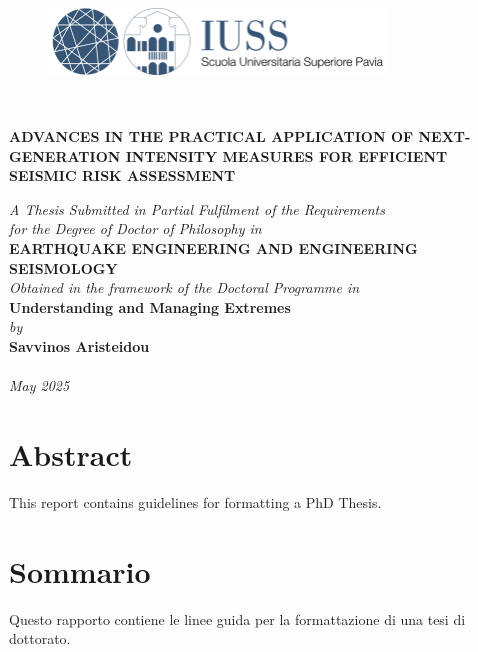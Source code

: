\documentclass[12pt,a4paper,twoside, openright]{report}
\let\oldchapter\chapter
\renewcommand{\chapter}[1]{
	\oldchapter{#1}
	\thispagestyle{empty}
}
\begin{document}
	
	\begin{titlepage}
		\centering
		\begin{figure}[h!]
			\centering
			\includegraphics[width=0.8\textwidth]{figures/IUSS_logo.png}
		\end{figure}
		\\
		\vspace*{2cm}
		{\Large\bfseries ADVANCES IN THE PRACTICAL APPLICATION OF NEXT-GENERATION INTENSITY MEASURES FOR EFFICIENT SEISMIC RISK ASSESSMENT\par}
		\vspace{1cm}
		\textit{A Thesis Submitted in Partial Fulfilment of the Requirements\\
			for the Degree of Doctor of Philosophy in}\\[1cm]
		\textbf{EARTHQUAKE ENGINEERING AND ENGINEERING SEISMOLOGY}\\
		\vspace{1cm}
		\textit{Obtained in the framework of the Doctoral Programme in}\\[0.8cm]
		\textbf{Understanding and Managing Extremes}\\[1cm]
		\textit{by}\\[0.3cm]
		\textbf{Savvinos Aristeidou}\\[0.3cm]
		\\
		\vfill
		\textit{May 2025}
	\end{titlepage}
	
	\pagestyle{fancy}
	\fancyhf{}
	\fancyhead[RO]{\small\thepage} %
	\fancyhead[LE]{\small\thepage} %
	
	\oldchapter*{Abstract}
	
	This report contains guidelines for formatting a PhD Thesis.
	
	\newpage
	
	\oldchapter*{Sommario}
	
	Questo rapporto contiene le linee guida per la formattazione di una tesi di dottorato.
\end{document}
